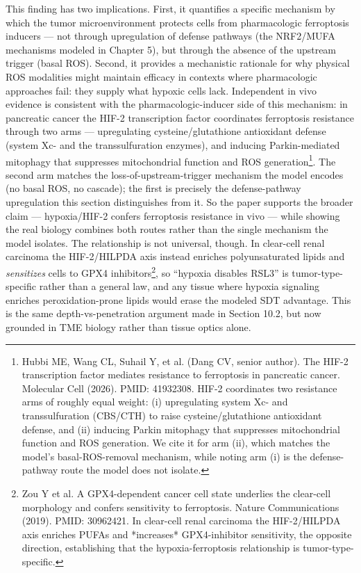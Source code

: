 \documentclass[11pt,twoside,openright]{report}
\begin{document}
This finding has two implications. First, it quantifies a specific mechanism by which the tumor microenvironment protects cells from pharmacologic ferroptosis inducers --- not through upregulation of defense pathways (the NRF2/MUFA mechanisms modeled in Chapter 5), but through the absence of the upstream trigger (basal ROS). Second, it provides a mechanistic rationale for why physical ROS modalities might maintain efficacy in contexts where pharmacologic approaches fail: they supply what hypoxic cells lack. Independent in vivo evidence is consistent with the pharmacologic-inducer side of this mechanism: in pancreatic cancer the HIF-2 transcription factor coordinates ferroptosis resistance through two arms --- upregulating cysteine/glutathione antioxidant defense (system Xc- and the transsulfuration enzymes), and inducing Parkin-mediated mitophagy that suppresses mitochondrial function and ROS generation\footnote{Hubbi ME, Wang CL, Suhail Y, et al. (Dang CV, senior author). The HIF-2 transcription factor mediates resistance to ferroptosis in pancreatic cancer. Molecular Cell (2026). PMID: 41932308. HIF-2 coordinates two resistance arms of roughly equal weight: (i) upregulating system Xc- and transsulfuration (CBS/CTH) to raise cysteine/glutathione antioxidant defense, and (ii) inducing Parkin mitophagy that suppresses mitochondrial function and ROS generation. We cite it for arm (ii), which matches the model's basal-ROS-removal mechanism, while noting arm (i) is the defense-pathway route the model does not isolate.}. The second arm matches the loss-of-upstream-trigger mechanism the model encodes (no basal ROS, no cascade); the first is precisely the defense-pathway upregulation this section distinguishes from it. So the paper supports the broader claim --- hypoxia/HIF-2 confers ferroptosis resistance in vivo --- while showing the real biology combines both routes rather than the single mechanism the model isolates. The relationship is not universal, though. In clear-cell renal carcinoma the HIF-2/HILPDA axis instead enriches polyunsaturated lipids and \textit{sensitizes} cells to GPX4 inhibitors\footnote{Zou Y et al. A GPX4-dependent cancer cell state underlies the clear-cell morphology and confers sensitivity to ferroptosis. Nature Communications (2019). PMID: 30962421. In clear-cell renal carcinoma the HIF-2/HILPDA axis enriches PUFAs and *increases* GPX4-inhibitor sensitivity, the opposite direction, establishing that the hypoxia-ferroptosis relationship is tumor-type-specific.}, so ``hypoxia disables RSL3'' is tumor-type-specific rather than a general law, and any tissue where hypoxia signaling enriches peroxidation-prone lipids would erase the modeled SDT advantage. This is the same depth-vs-penetration argument made in Section 10.2, but now grounded in TME biology rather than tissue optics alone.
\end{document}
